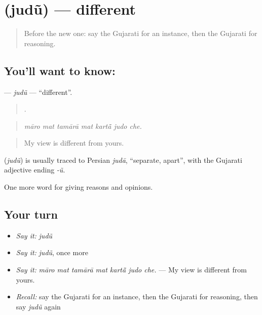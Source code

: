 \section[\texorpdfstring{\gu{જુદું} (judũ)}{જુદું (judũ)}]{ (judũ) — different}

\label{lesson:GU-C346-judu}



\begin{quote}
Before the new one: say the Gujarati for an instance, then the Gujarati for reasoning.
\end{quote}

\subsection*{You'll want to know: }
\textbf{} — \emph{judũ} — \textquotedblleft{}different\textquotedblright{}.

\begin{quote}
      .
\end{quote}

\begin{quote}
\emph{māro mat tamārā mat kartā̃ judo che.}
\end{quote}

\begin{quote}
My view is different from yours.
\end{quote}

\begin{cousinweb}
\textbf{} (\emph{judũ}) is usually traced to Persian \emph{judā}, \textquotedblleft{}separate, apart\textquotedblright{}, with the Gujarati adjective ending \emph{-ũ}.
\end{cousinweb}

\begin{grammarlens}[title={What you've built}]
One more word for giving reasons and opinions.
\end{grammarlens}

\subsection*{Your turn}
\begin{itemize}
\raggedright
  \item \emph{Say it:} \emph{judũ}
  \item \emph{Say it:} \emph{judũ}, once more
  \item \emph{Say it:} \emph{māro mat tamārā mat kartā̃ judo che.} — My view is different from yours.
  \item \emph{Recall:} say the Gujarati for an instance, then the Gujarati for reasoning, then say \emph{judũ} again
\end{itemize}

